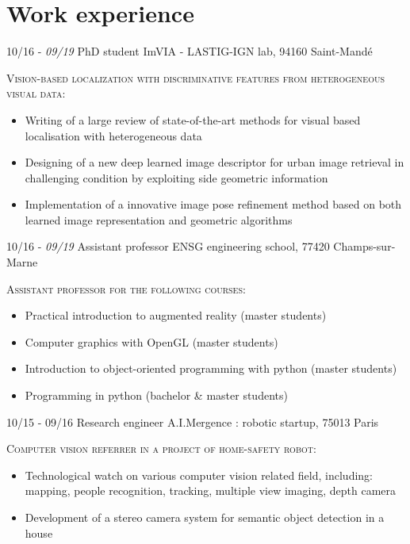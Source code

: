 \documentclass[]{friggeri-cv}
\begin{document}
\section{Work experience}
\begin{entrylist}
  \entry
    {\small{10/16 - \textit{09/19}}}
    {PhD student}
    {ImVIA - LASTIG-IGN lab, 94160 Saint-Mandé}
    {\textsc{Vision-based localization with discriminative features from heterogeneous visual data:}
    \begin{itemize}[label=$\rhd$]
    	\item Writing of a large review of state-of-the-art methods for visual based localisation with heterogeneous data
        \item Designing of a new deep learned image descriptor for urban image retrieval in challenging condition by exploiting side geometric information
        \item Implementation of a innovative image pose refinement method based on both learned image representation and geometric algorithms
    \end{itemize}
    }
  \entry
    {\small{10/16 - \textit{09/19}}}
    {Assistant professor}
    {ENSG engineering school, 77420 Champs-sur-Marne}
    {\textsc{Assistant professor for the following courses:}
    \begin{itemize}[label=$\rhd$]
        \item Practical introduction to augmented reality (master students)
        \item Computer graphics with OpenGL (master students)
   		\item Introduction to object-oriented programming with python (master students)
        \item Programming in python (bachelor \& master students)
    \end{itemize}
    }
  \entry
    {\small{10/15 - 09/16}}
    {Research engineer}
    {A.I.Mergence : robotic startup, 75013 Paris}
    {\textsc{Computer vision referrer in a project of home-safety robot:}
    \begin{itemize}[label=$\rhd$]
    	\item Technological watch on various computer vision related field, including: mapping, people recognition, tracking, multiple view imaging, depth camera
    	\item Development of a stereo camera system for semantic object detection in a house

\end{itemize}}
\end{entrylist}
\end{document}
